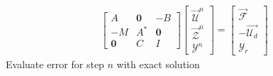 \documentclass[smallextended]{svjour3}
\numberwithin{equation}{section}
\numberwithin{figure}{section}
\numberwithin{table}{section}
\newcommand\cero{{\boldsymbol{0}}}
\newcommand\bV{\mathbf{V}}
\newcommand\by{\boldsymbol{y}}
\newcommand\cT{\mathcal{T}}
\begin{document}
\begin{algorithm*}
{\begin{algorithmic}[1]
\begin{gather*}
            \end{gather*}
            \begin{align*}
			\begin{bmatrix}
				A & \cero & -B \\
				-M & A^* & \cero \\
				\cero & C & I
			\end{bmatrix}
			\begin{bmatrix}
				\vec{\mathcal{U}}^n \\
				\vec{\mathcal{Z}}^n \\
				{\mathcal{Y}}^n
			\end{bmatrix}
			= \begin{bmatrix}
				\vec{\mathcal{F}}  \\
				-\vec{\mathcal{U}_d} \\
				{\mathcal{Y}_r}
			\end{bmatrix} 
            \end{align*}
            \State Evaluate error for step $n$ with exact solution 
		\EndFor
    \EndWhile
	\end{algorithmic} 
    }
\end{algorithm*}


\end{document}
